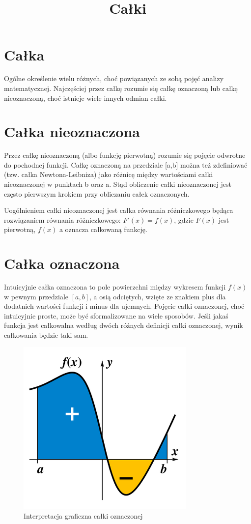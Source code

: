 \documentclass{article}
\title{Całki}
\begin{document}
\maketitle
\tableofcontents
\section{Całka}
Ogólne określenie wielu różnych, choć powiązanych ze sobą pojęć analizy matematycznej. Najczęściej przez całkę rozumie się całkę oznaczoną lub całkę nieoznaczoną, choć istnieje wiele innych odmian całki.
\section{Całka nieoznaczona}
Przez całkę nieoznaczoną (albo funkcję pierwotną) rozumie się pojęcie odwrotne do pochodnej funkcji. Całkę oznaczoną na przedziale [a,b] można też zdefiniować (tzw. całka Newtona-Leibniza) jako różnicę między wartościami całki nieoznaczonej w punktach b oraz a. Stąd obliczenie całki nieoznaczonej jest często pierwszym krokiem przy obliczaniu całek oznaczonych.

Uogólnieniem całki nieoznaczonej jest całka równania różniczkowego będąca rozwiązaniem równania różniczkowego: $F'(x)=f(x)$, gdzie $F(x)$ jest pierwotną, $f(x)$ a oznacza całkowaną funkcję.
\section{Całka oznaczona}
Intuicyjnie całka oznaczona to pole powierzchni między wykresem funkcji $f(x)$ w pewnym przedziale $[a,b]$, a osią odciętych, wzięte ze znakiem plus dla dodatnich wartości funkcji i minus dla ujemnych. Pojęcie całki oznaczonej, choć intuicyjnie proste, może być sformalizowane na wiele sposobów. Jeśli jakaś funkcja jest całkowalna według dwóch różnych definicji całki oznaczonej, wynik całkowania będzie taki sam.

\begin{figure}
\caption{Interpretacja graficzna całki oznaczonej}
\label{fig:interpretacja}
\includegraphics[scale=1.5]{calka1.png}
\centering
\end{figure}
\end{document}
